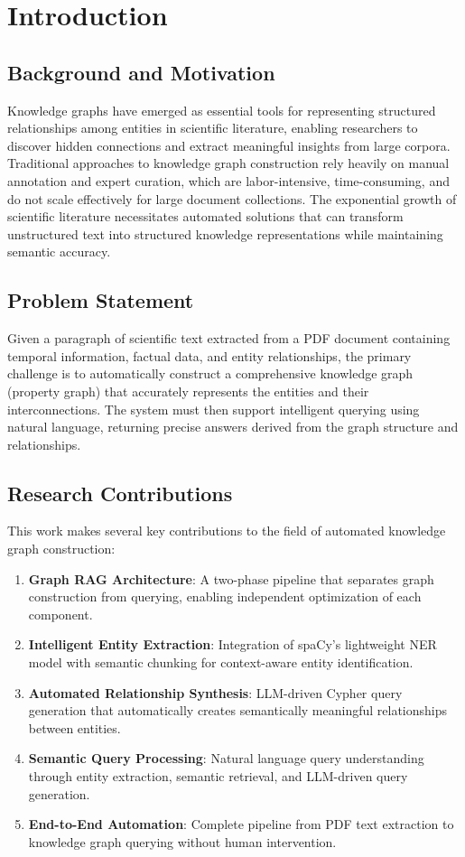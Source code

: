 \documentclass[conference]{IEEEtran}
\begin{document}
\section{Introduction}

\subsection{Background and Motivation}
Knowledge graphs have emerged as essential tools for representing structured relationships among entities in scientific literature, enabling researchers to discover hidden connections and extract meaningful insights from large corpora. Traditional approaches to knowledge graph construction rely heavily on manual annotation and expert curation, which are labor-intensive, time-consuming, and do not scale effectively for large document collections. The exponential growth of scientific literature necessitates automated solutions that can transform unstructured text into structured knowledge representations while maintaining semantic accuracy.

\subsection{Problem Statement}
Given a paragraph of scientific text extracted from a PDF document containing temporal information, factual data, and entity relationships, the primary challenge is to automatically construct a comprehensive knowledge graph (property graph) that accurately represents the entities and their interconnections. The system must then support intelligent querying using natural language, returning precise answers derived from the graph structure and relationships.

\subsection{Research Contributions}
This work makes several key contributions to the field of automated knowledge graph construction:

\begin{enumerate}
\item \textbf{Graph RAG Architecture}: A two-phase pipeline that separates graph construction from querying, enabling independent optimization of each component.
\item \textbf{Intelligent Entity Extraction}: Integration of spaCy's lightweight NER model with semantic chunking for context-aware entity identification.
\item \textbf{Automated Relationship Synthesis}: LLM-driven Cypher query generation that automatically creates semantically meaningful relationships between entities.
\item \textbf{Semantic Query Processing}: Natural language query understanding through entity extraction, semantic retrieval, and LLM-driven query generation.
\item \textbf{End-to-End Automation}: Complete pipeline from PDF text extraction to knowledge graph querying without human intervention.
\end{enumerate}
\end{document}
